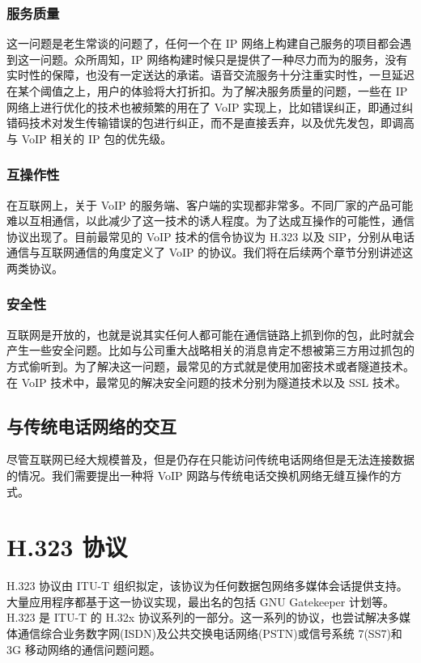 \documentclass[lang=cn]{elegantpaper}
\begin{document}
\subsubsection{服务质量}

这一问题是老生常谈的问题了，任何一个在 IP 网络上构建自己服务的项目都会遇到这一问题。众所周知，IP 网络构建时候只是提供了一种尽力而为的服务，没有实时性的保障，也没有一定送达的承诺。语音交流服务十分注重实时性，一旦延迟在某个阈值之上，用户的体验将大打折扣。为了解决服务质量的问题，一些在 IP 网络上进行优化的技术也被频繁的用在了 VoIP 实现上，比如错误纠正，即通过纠错码技术对发生传输错误的包进行纠正，而不是直接丢弃，以及优先发包，即调高与 VoIP 相关的 IP 包的优先级。

\subsubsection{互操作性}
在互联网上，关于 VoIP 的服务端、客户端的实现都非常多。不同厂家的产品可能难以互相通信，以此减少了这一技术的诱人程度。为了达成互操作的可能性，通信协议出现了。目前最常见的 VoIP 技术的信令协议为 H.323 以及 SIP，分别从电话通信与互联网通信的角度定义了 VoIP 的协议。我们将在后续两个章节分别讲述这两类协议。

\subsubsection{安全性}
互联网是开放的，也就是说其实任何人都可能在通信链路上抓到你的包，此时就会产生一些安全问题。比如与公司重大战略相关的消息肯定不想被第三方用过抓包的方式偷听到。为了解决这一问题，最常见的方式就是使用加密技术或者隧道技术。在 VoIP 技术中，最常见的解决安全问题的技术分别为隧道技术以及 SSL 技术。

\subsection{与传统电话网络的交互}
尽管互联网已经大规模普及，但是仍存在只能访问传统电话网络但是无法连接数据的情况。我们需要提出一种将 VoIP 网路与传统电话交换机网络无缝互操作的方式。

\section{H.323 协议}

H.323\cite{hersent_ip_2000} 协议由 ITU-T 组织拟定，该协议为任何数据包网络多媒体会话提供支持。大量应用程序都基于这一协议实现，最出名的包括 GNU Gatekeeper 计划等。H.323 是 ITU-T 的 H.32x 协议系列的一部分。这一系列的协议，也尝试解决多媒体通信综合业务数字网(ISDN)及公共交换电话网络(PSTN)或信号系统 7(SS7)和 3G 移动网络的通信问题问题。
\end{document}
